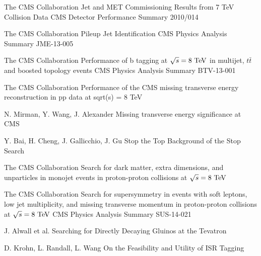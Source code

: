 \begin{thebibliography}{2}
             {The CMS Collaboration}
             {Jet and MET Commissioning Results from 7 TeV Collision Data}
             {CMS Detector Performance Summary 2010/014}

             {The CMS Collaboration}
             {Pileup Jet Identification}
             {CMS Physics Analysis Summary JME-13-005}

             {The CMS Collaboration}
             {Performance of b tagging at $\sqrt{s} = 8~\text{TeV}$ in multijet, $t\bar{t}$ and
             boosted topology events}
             {CMS Physics Analysis Summary BTV-13-001}

             {The CMS Collaboration}
             {Performance of the CMS missing transverse energy reconstruction in pp data at sqrt(s) = 8 TeV}
             {}


             {N. Mirman, Y. Wang, J. Alexander}
             {Missing transverse energy significance at CMS}
             {}

             {Y. Bai, H. Cheng, J. Gallicchio, J. Gu}
             {Stop the Top Background of the Stop Search}
             {}


             {The CMS Collaboration}
             {Search for dark matter, extra dimensions, and unparticles in monojet events in proton-proton collisions at $\sqrt{s} = 8~\text{TeV}$}
             {}

             {The CMS Collaboration}
             {Search for supersymmetry in events with soft leptons, low
             jet multiplicity, and missing transverse momentum in
             proton-proton collisions at $\sqrt{s} = 8~\text{TeV}$}
             {CMS Physics Analysis Summary SUS-14-021}

             {J. Alwall et al.}
             {Searching for Directly Decaying Gluinos at the Tevatron}
             {}

             {D. Krohn, L. Randall, L. Wang}
             {On the Feasibility and Utility of ISR Tagging}
             {}


\end{thebibliography}
